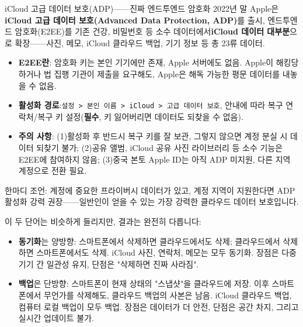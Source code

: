 \begin{tcbwarn}{iCloud 고급 데이터 보호(ADP)——진짜 엔드투엔드 암호화}
2022년 말 Apple은\textbf{iCloud 고급 데이터 보호(Advanced Data Protection, ADP)}를 출시, 엔드투엔드 암호화(E2EE)를 기존 건강, 비밀번호 등 소수 데이터에서\textbf{iCloud 데이터 대부분}으로 확장——사진, 메모, iCloud 클라우드 백업, 기기 정보 등 총 23류 데이터.

\begin{itemize}
  \item \textbf{E2EE란}: 암호화 키는 본인 기기에만 존재, Apple 서버에도 없음. Apple이 해킹당하거나 법 집행 기관이 제출을 요구해도, Apple은 해독 가능한 평문 데이터를 내놓을 수 없음.
  \item \textbf{활성화 경로}:\texttt{설정 > 본인 이름 > iCloud > 고급 데이터 보호}, 안내에 따라 복구 연락처/복구 키 설정(\textbf{필수}, 키 잃어버리면 데이터도 되찾을 수 없음).
  \item \textbf{주의 사항}: (1)활성화 후 반드시 복구 키를 잘 보관, 그렇지 않으면 계정 분실 시 데이터 되찾기 불가; (2)공유 앨범, iCloud 공유 사진 라이브러리 등 소수 기능은 E2EE에 참여하지 않음; (3)중국 본토 Apple ID는 아직 ADP 미지원, 다른 지역 계정으로 전환 필요.
\end{itemize}

한마디 조언: 계정에 중요한 프라이버시 데이터가 있고, 계정 지역이 지원한다면 ADP 활성화 강력 권장——일반인이 얻을 수 있는 가장 강력한 클라우드 데이터 보호입니다.

\end{tcbwarn}


이 두 단어는 비슷하게 들리지만, 결과는 완전히 다릅니다:

\begin{itemize}
  \item \textbf{동기화}는 양방향: 스마트폰에서 삭제하면 클라우드에서도 삭제; 클라우드에서 삭제하면 스마트폰에서도 삭제. iCloud 사진, 연락처, 메모는 모두 동기화. 장점은 다중 기기 간 일관성 유지, 단점은 "삭제하면 진짜 사라짐".
  \item \textbf{백업}은 단방향: 스마트폰이 현재 상태의 "스냅샷"을 클라우드에 저장. 이후 스마트폰에서 무언가를 삭제해도, 클라우드 백업의 사본은 남음. iCloud 클라우드 백업, 컴퓨터 로컬 백업이 모두 백업. 장점은 데이터가 더 안전, 단점은 공간 차지, 그리고 실시간 업데이트 불가.
\end{itemize}


